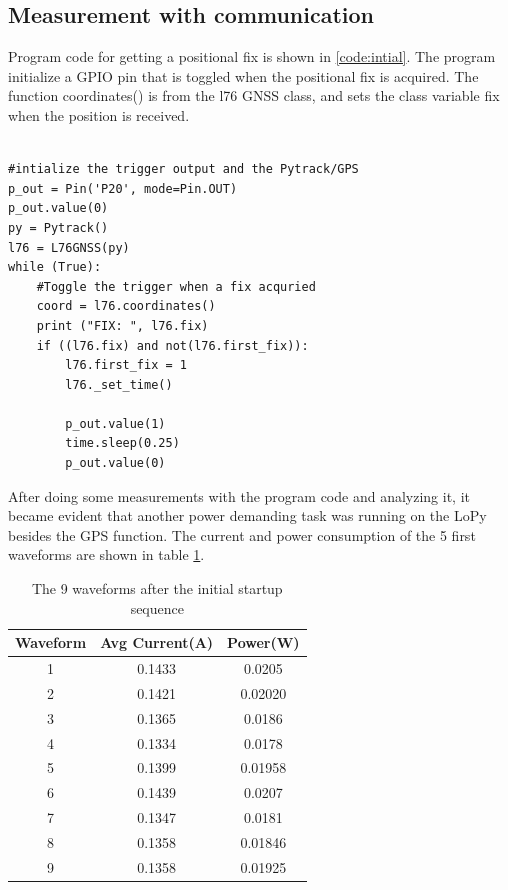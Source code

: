\subsection{Measurement with communication}
Program code for getting a positional fix is shown in \ref{code:intial}. The program initialize a GPIO pin that is toggled when the positional fix is acquired. The function coordinates() is from the l76 GNSS class, and sets the class variable fix when the position is received. 
\lstset{language=Python}          %
\begin{lstlisting}[frame=single,caption = main.py]  % Start your code-block

#intialize the trigger output and the Pytrack/GPS
p_out = Pin('P20', mode=Pin.OUT)
p_out.value(0)
py = Pytrack()
l76 = L76GNSS(py)
while (True):
    #Toggle the trigger when a fix acquried
    coord = l76.coordinates()
    print ("FIX: ", l76.fix)
    if ((l76.fix) and not(l76.first_fix)):
        l76.first_fix = 1
        l76._set_time()

        p_out.value(1)
        time.sleep(0.25)
        p_out.value(0)
\end{lstlisting}
\label{code:intial}
After doing some measurements with the program code and analyzing it, it became evident that another power demanding task was running on the LoPy besides the GPS function. The current and power consumption of the 5 first waveforms are shown in table \ref{Table:WIFI_ON}.
\begin{table}[h!]
\begin{center}
 \begin{tabular}{||c c c||} 
 \hline
 Waveform & Avg Current(A) & Power(W)\\ [0.5ex] 
 \hline\hline
 1 & 0.1433    & 0.0205 \\ 
 \hline
 2 & 0.1421    & 0.02020 \\
 \hline
 3 & 0.1365  & 0.0186 \\
 \hline
 4 & 0.1334  & 0.0178 \\
 \hline
 5 & 0.1399  & 0.01958 \\ 
 \hline
 \rowcolor{red}
 6 & 0.1439    & 0.0207 \\ 
 \hline
 7 & 0.1347  & 0.0181 \\
 \hline
 8 & 0.1358  & 0.01846 \\
 \hline
 9 & 0.1358    & 0.01925 \\[1ex]
 \hline
\end{tabular}
\end{center}
\caption{The 9 waveforms after the initial startup sequence}
\label{Table:WIFI_ON}
\end{table}

